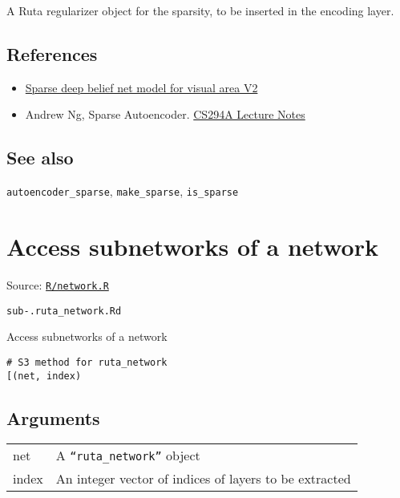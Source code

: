 A Ruta regularizer object for the sparsity, to be inserted in the
encoding layer.

\hypertarget{references}{\subsection{\texorpdfstring{\protect\hyperlink{references}{}References}{References}}\label{references}}

\begin{itemize}
\item
  \href{http://papers.nips.cc/paper/3313-sparse-deep-belief-net-model-for-visual-area-v2}{Sparse
  deep belief net model for visual area V2}
\item
  Andrew Ng, Sparse Autoencoder.
  \href{https://web.stanford.edu/class/cs294a/sparseAutoencoder_2011new.pdf}{CS294A
  Lecture Notes}
\end{itemize}

\hypertarget{see-also}{\subsection{\texorpdfstring{\protect\hyperlink{see-also}{}See
also}{See also}}\label{see-also}}

\texttt{autoencoder\_sparse}, \texttt{make\_sparse}, \texttt{is\_sparse}

\section{Access subnetworks of a
network}\label{access-subnetworks-of-a-network}

Source:
\href{https://github.com/fdavidcl/ruta/blob/master/R/network.R}{\texttt{R/network.R}}

\texttt{sub-.ruta\_network.Rd}

Access subnetworks of a network

\begin{verbatim}
# S3 method for ruta_network
[(net, index)
\end{verbatim}

\hypertarget{arguments}{\subsection{\texorpdfstring{\protect\hyperlink{arguments}{}Arguments}{Arguments}}\label{arguments}}

\begin{longtable}[c]{@{}>{\small}p{3cm}>{\raggedright}p{12.5cm}@{}}
\toprule
net & A \texttt{``ruta\_network''} object\tabularnewline
index & An integer vector of indices of layers to be
extracted\tabularnewline
\bottomrule
\end{longtable}

